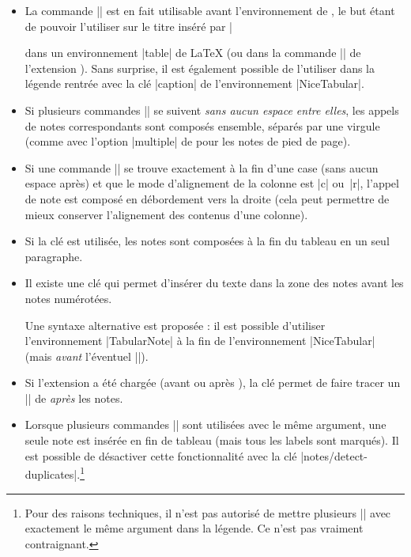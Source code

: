 \documentclass[dvipsnames]{article}
\begin{document}
\medskip
\begin{itemize}[beginpenalty=10000]
\item La commande |\tabularnote| est en fait utilisable avant
l'environnement de , le but étant de pouvoir l'utiliser sur le
titre inséré par |\caption| dans un environnement |{table}| de LaTeX (ou dans la
commande |\captionof| de l'extension ). Sans surprise, il est
également possible de l'utiliser dans la légende rentrée avec la clé |caption|
de l'environnement |{NiceTabular}|.

\item Si plusieurs commandes || se suivent \emph{sans aucun espace
  entre elles}, les appels de notes correspondants sont composés ensemble,
séparés par une virgule (comme avec l'option |multiple| de  pour
les notes de pied de page).

\item Si une commande || se trouve exactement à la fin d'une
case (sans aucun espace après) et que le mode d'alignement de la colonne est |c|
ou~|r|, l'appel de note est composé en débordement vers la droite (cela peut
permettre de mieux conserver l'alignement des contenus d'une colonne).

\item Si la clé  est utilisée, les notes sont composées à
la fin du tableau en un seul paragraphe.

\item {}
Il existe une clé  qui permet d'insérer du texte dans la
zone des notes avant les notes numérotées.


Une syntaxe alternative est proposée : il est possible d'utiliser
l'environnement |{TabularNote}| à la fin de l'environnement |{NiceTabular}|
(mais \emph{avant} l'éventuel |\CodeAfter|).

\item Si l'extension  a été chargée (avant ou après
), la clé  permet de faire tracer
un |\bottomrule| de  \emph{après} les notes.

\item Lorsque plusieurs commandes |\tabularnote| sont utilisées avec le même
argument, une seule note est insérée en fin de tableau (mais tous les labels
sont marqués). Il est possible de désactiver cette fonctionnalité avec la clé
|notes/detect-duplicates|.\footnote{Pour des raisons techniques, il n'est pas
  autorisé de mettre plusieurs |\tabularnote| avec exactement le même argument
  dans la légende. Ce n'est pas vraiment contraignant.}


\end{itemize}
\end{document}
